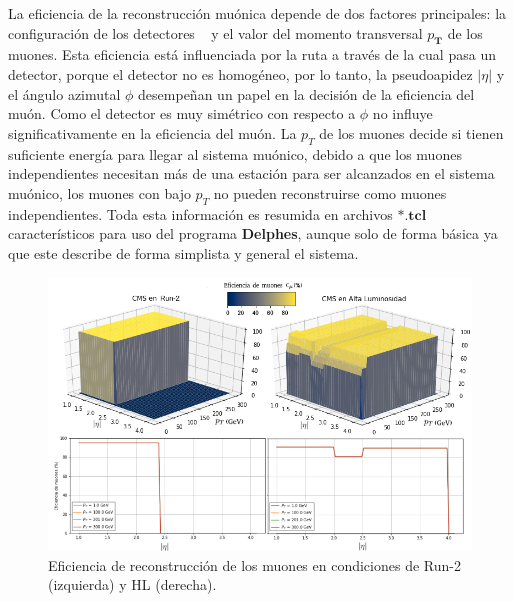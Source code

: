 La eficiencia de la reconstrucción muónica depende de dos factores principales: la configuración de los detectores \CMS ~ y el valor del  momento transversal $p_\mathbf{T}$ de los muones. Esta eficiencia está influenciada por la ruta a través de la cual pasa un detector, porque el detector no es homogéneo, por lo tanto, la pseudoapidez $|\eta|$ y el ángulo azimutal $\phi$ desempeñan un papel en la decisión de la eficiencia del muón. Como el detector es muy simétrico con respecto a $\phi$ no influye significativamente en la eficiencia del muón. La $p_T$ de los muones decide si tienen suficiente energía para llegar al sistema muónico, debido a que los muones independientes necesitan más de una estación para ser alcanzados en el sistema muónico, los muones con bajo $p_T$ no pueden reconstruirse como muones independientes. Toda esta información es resumida en archivos $\mathbf{*.tcl}$ característicos para uso del programa \textbf{Delphes}, aunque solo de forma básica ya que este describe de forma simplista y general el sistema.

\begin{figure}[!t]
\centering
\includegraphics[width=1\textwidth]{Cap2/imagenes/Eficiencia_of_Muon.png}
\caption{Eficiencia de reconstrucción de los muones en condiciones de Run-2 (izquierda) y HL (derecha).}
\label{Compara_eficiencia_muon}
\end{figure}











